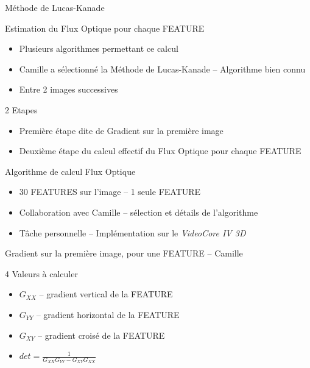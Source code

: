 \documentclass{bredelebeamer}
\begin{document}

\begin{frame}{Méthode de Lucas-Kanade}

\begin{block}{Estimation du Flux Optique pour chaque FEATURE}
\begin{itemize}
	\item Plusieurs algorithmes permettant ce calcul
	\item Camille a sélectionné la Méthode de Lucas-Kanade -- Algorithme bien connu
	\item Entre 2 images successives
\end{itemize}
\end{block}

\begin{exampleblock}{2 Etapes}
\begin{itemize}
	\item Première étape dite de Gradient sur la première image
	\item Deuxième étape du calcul effectif du Flux Optique pour chaque FEATURE
\end{itemize}
\end{exampleblock}

\begin{alertblock}{Algorithme de calcul Flux Optique}
\begin{itemize}
	\item 30 FEATURES sur l'image -- 1 seule FEATURE
	\item Collaboration avec Camille -- sélection et détails de l'algorithme
	\item T\^ache personnelle -- Implémentation sur le \emph{VideoCore IV 3D}
\end{itemize}
\end{alertblock}
\end{frame}


\begin{frame}{Gradient sur la première image, pour une FEATURE -- Camille}

	\begin{block}{4 Valeurs à calculer}
\begin{itemize}
	\item $G_{XX}$ -- gradient vertical de la FEATURE
	\item $G_{YY}$ -- gradient horizontal de la FEATURE
	\item $G_{XY}$ -- gradient croisé de la FEATURE
	\item $det = \frac{1}{G_{XX}G_{YY}-G_{XY}G_{XX}}$
\end{itemize}
\end{block}



\end{frame}
\end{document}
